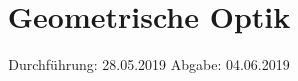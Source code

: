 

\subject{V408}
\title{Geometrische Optik}
\date{%
  Durchführung: 28.05.2019
  \hspace{3em}
  Abgabe: 04.06.2019
}



\maketitle
\thispagestyle{empty}
\tableofcontents
\newpage






\printbibliography{}


